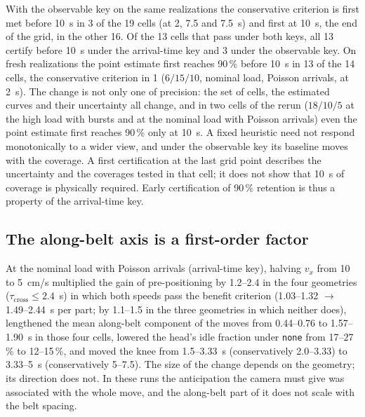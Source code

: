 \documentclass[11pt,a4paper]{article}
\newcommand{\tcross}{\tau_{\mathrm{cross}}}
\begin{document}
With the observable key on the same realizations the conservative criterion is first met
before 10~s in 3 of the 19 cells (at 2, 7.5 and 7.5~s) and first at 10~s, the end of the
grid, in the other 16. Of the 13 cells that pass under both keys, all 13 certify before
10~s under the arrival-time key and 3 under the observable key. On fresh realizations the
point estimate first reaches 90\,\% before 10~s in 13 of the 14 cells, the conservative
criterion in 1 ($6/15/10$, nominal load, Poisson arrivals, at 2~s). The change is not only
one of precision: the set of cells, the estimated curves and their uncertainty all change,
and in two cells of the rerun ($18/10/5$ at the high load with bursts and at the nominal
load with Poisson arrivals) even the point estimate first reaches 90\,\% only at 10~s. A
fixed heuristic need not respond monotonically to a wider view, and under the observable
key its baseline moves with the coverage. A first certification at the last grid point
describes the uncertainty and the coverages tested in that cell; it does not show that
10~s of coverage is physically required. Early certification of 90\,\% retention is thus a
property of the arrival-time key.

\subsection{The along-belt axis is a first-order factor}\label{sec:vx}\label{sec:predict}
At the nominal load with Poisson arrivals (arrival-time key), halving $v_x$ from 10 to
5~cm/s multiplied the gain of pre-positioning by 1.2--2.4 in the four geometries
($\tcross\le2.4$~s) in which both speeds pass the benefit criterion (1.03--1.32 $\to$
1.49--2.44~s per part; by 1.1--1.5 in the three geometries in which neither does),
lengthened the mean along-belt component of the moves from 0.44--0.76 to 1.57--1.90~s in
those four cells, lowered the head's idle fraction under \texttt{none} from 17--27\,\% to
12--15\,\%, and moved the knee from 1.5--3.33~s (conservatively 2.0--3.33) to 3.33--5~s
(conservatively 5--7.5). The size of the change depends on the geometry; its direction does
not. In these runs the anticipation the camera must give was associated with the whole
move, and the along-belt part of it does not scale with the belt spacing.
\end{document}
